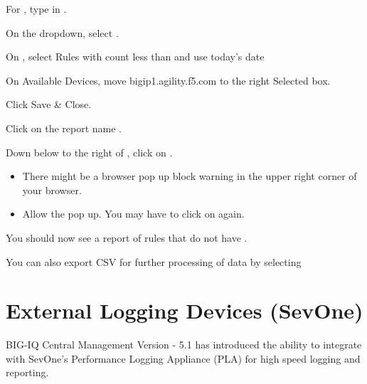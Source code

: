 \documentclass[letterpaper,10pt,english]{sphinxmanual}
\begin{document}
For , type in .

On the  dropdown, select .

On , select Rules with count less than  and
use today’s date

On Available Devices, move bigip1.agility.f5.com to the right Selected
box.

Click Save \& Close.

Click on the report name .


Down below to the right of , click on .
\begin{itemize}
\item {} 
There might be a browser pop up block warning in the upper right
corner of your browser.

\item {} 
Allow the pop up. You may have to click on  again.

\end{itemize}

You should now see a report of rules that do not have .

You can also export CSV for further processing of data by selecting


\section{External Logging Devices (SevOne)}
\label{\detokenize{class1/module6/module6:external-logging-devices-sevone}}\label{\detokenize{class1/module6/module6::doc}}
BIG-IQ Central Management Version - 5.1 has introduced the ability to
integrate with SevOne’s Performance Logging Appliance (PLA) for high
speed logging and reporting.
\end{document}
